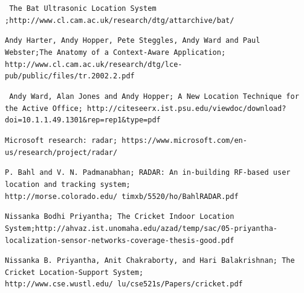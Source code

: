 \documentclass[a4paper]{IEEEtran}
\begin{document}
\begin{thebibliography}{9}
\texttt{ The Bat Ultrasonic Location System ;http://www.cl.cam.ac.uk/research/dtg/attarchive/bat/ }

\texttt{Andy Harter, Andy Hopper, Pete Steggles, Andy Ward and Paul Webster;The Anatomy of a Context-Aware Application; http://www.cl.cam.ac.uk/research/dtg/lce-pub/public/files/tr.2002.2.pdf }

\texttt{ Andy Ward, Alan Jones and Andy Hopper; A New Location Technique for the Active Office; http://citeseerx.ist.psu.edu/viewdoc/download?doi=10.1.1.49.1301&rep=rep1&type=pdf}

\texttt{Microsoft research: radar; https://www.microsoft.com/en-us/research/project/radar/}

\texttt{P. Bahl and V. N. Padmanabhan; RADAR: An in-building RF-based user
location and tracking system; http://morse.colorado.edu/~timxb/5520/ho/BahlRADAR.pdf}

\texttt{Nissanka Bodhi Priyantha; The Cricket Indoor Location System;http://ahvaz.ist.unomaha.edu/azad/temp/sac/05-priyantha-localization-sensor-networks-coverage-thesis-good.pdf}

\texttt{Nissanka B. Priyantha, Anit Chakraborty, and Hari Balakrishnan; The Cricket Location-Support System; http://www.cse.wustl.edu/~lu/cse521s/Papers/cricket.pdf}



 
 
\end{thebibliography}
\end{document}
